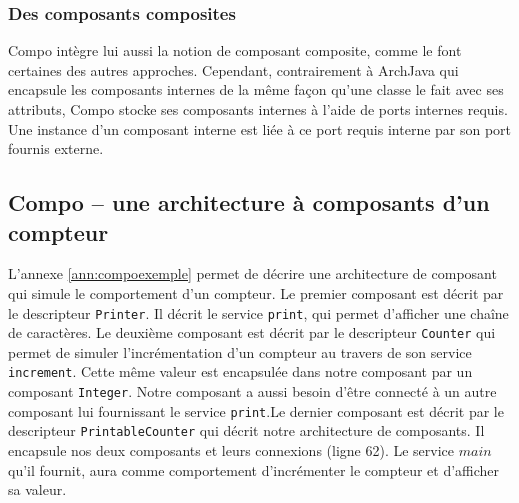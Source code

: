     \subsubsection{Des composants composites}
      
    Compo intègre lui aussi la notion de composant composite, comme le font certaines des autres approches. Cependant, contrairement à ArchJava qui encapsule les composants internes de la même façon qu'une classe le fait avec ses attributs, Compo stocke ses composants internes à l'aide de ports internes requis. Une instance d'un composant interne est liée à ce port requis interne par son port fournis externe.
  
    \subsection{Compo -- une architecture à composants d'un compteur}
    
    L'annexe \ref{ann:compoexemple} permet de décrire une architecture de composant qui simule le comportement d'un compteur. Le premier composant est décrit par le descripteur \texttt{Printer}. Il décrit le service \texttt{print}, qui permet d'afficher une chaîne de caractères. Le deuxième composant est décrit par le descripteur \texttt{Counter} qui permet de simuler l'incrémentation d'un compteur au travers de son service \texttt{increment}. Cette même valeur est encapsulée dans notre composant par un composant \texttt{Integer}. Notre composant a aussi besoin d'être connecté à un autre composant lui fournissant le service \texttt{print}.Le dernier composant est décrit par le descripteur \texttt{PrintableCounter} qui décrit notre architecture de composants. Il encapsule nos deux composants et leurs connexions (ligne 62). Le service $main$ qu'il fournit, aura comme comportement d'incrémenter le compteur et d'afficher sa valeur.  
    
      
      
      


      
      
